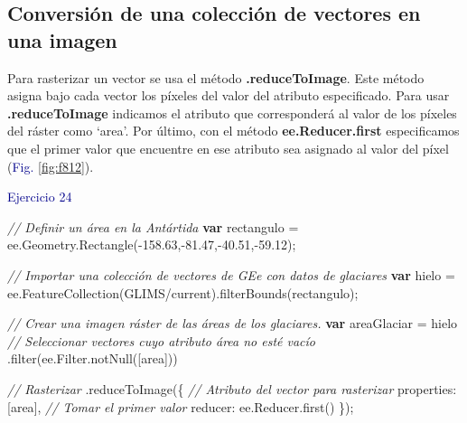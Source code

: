 \documentclass[
  12pt,
  letterpaper,
  twoside]{book}
\newenvironment{Shaded}{\begin{snugshade}}{\end{snugshade}}
\newcommand{\AttributeTok}[1]{\textcolor[rgb]{0.48,0.12,0.64}{#1}}
\newcommand{\CommentTok}[1]{\textcolor[rgb]{0.24,0.58,0.00}{\textit{#1}}}
\newcommand{\ControlFlowTok}[1]{\textcolor[rgb]{0.00,0.00,0.00}{\textbf{#1}}}
\newcommand{\DataTypeTok}[1]{\textcolor[rgb]{0.00,0.00,0.00}{#1}}
\newcommand{\FloatTok}[1]{\textcolor[rgb]{0.28,0.53,0.93}{#1}}
\newcommand{\FunctionTok}[1]{\textcolor[rgb]{0.48,0.12,0.64}{#1}}
\newcommand{\KeywordTok}[1]{\textcolor[rgb]{0.48,0.12,0.64}{#1}}
\newcommand{\NormalTok}[1]{#1}
\newcommand{\OperatorTok}[1]{\textcolor[rgb]{0.00,0.00,0.00}{#1}}
\newcommand{\StringTok}[1]{\textcolor[rgb]{0.87,0.29,0.22}{#1}}
\newcommand\boldpurple[1]{\textcolor{darkpurple}{\textbf{#1}}}
\begin{document}
\hypertarget{conversiuxf3n-de-una-colecciuxf3n-de-vectores-en-una-imagen}{%
\subsection*{Conversión de una colección de vectores en una imagen}\label{conversiuxf3n-de-una-colecciuxf3n-de-vectores-en-una-imagen}}

Para rasterizar un vector se usa el método \boldpurple{.reduceToImage}. Este método asigna bajo cada vector los píxeles del valor del atributo especificado. Para usar \boldpurple{.reduceToImage} indicamos el atributo que corresponderá al valor de los píxeles del ráster como `area'. Por último, con el método \boldpurple{ee.Reducer.first} especificamos que el primer valor que encuentre en ese atributo sea asignado al valor del píxel (\textcolor{darkblue}{Fig.} \ref{fig:f812}).

\textcolor{darkblue}{Ejercicio 24}

\begin{Shaded}
\begin{Highlighting}[]
\CommentTok{// Definir un área en la Antártida}
\ControlFlowTok{var}\NormalTok{ rectangulo }\OperatorTok{=} \KeywordTok{ee}\OperatorTok{.}\AttributeTok{Geometry}\OperatorTok{.}\FunctionTok{Rectangle}\NormalTok{(}\OperatorTok{{-}}\FloatTok{158.63}\OperatorTok{,{-}}\FloatTok{81.47}\OperatorTok{,{-}}\FloatTok{40.51}\OperatorTok{,{-}}\FloatTok{59.12}\NormalTok{)}\OperatorTok{;}

\CommentTok{// Importar una colección de vectores de GEe con datos de glaciares}
\ControlFlowTok{var}\NormalTok{ hielo }\OperatorTok{=} \KeywordTok{ee}\OperatorTok{.}\FunctionTok{FeatureCollection}\NormalTok{(}\StringTok{\textquotesingle{}GLIMS/current\textquotesingle{}}\NormalTok{)}\OperatorTok{.}\FunctionTok{filterBounds}\NormalTok{(rectangulo)}\OperatorTok{;}

\CommentTok{// Crear una imagen ráster de las áreas de los glaciares.}
\ControlFlowTok{var}\NormalTok{ areaGlaciar }\OperatorTok{=}\NormalTok{ hielo}
\CommentTok{// Seleccionar vectores cuyo atributo área no esté vacío}
    \OperatorTok{.}\FunctionTok{filter}\NormalTok{(}\KeywordTok{ee}\OperatorTok{.}\AttributeTok{Filter}\OperatorTok{.}\FunctionTok{notNull}\NormalTok{([}\StringTok{\textquotesingle{}area\textquotesingle{}}\NormalTok{])) }
    
\CommentTok{// Rasterizar  }
\OperatorTok{.}\FunctionTok{reduceToImage}\NormalTok{(\{}
    \CommentTok{// Atributo del vector para rasterizar}
    \DataTypeTok{properties}\OperatorTok{:}\NormalTok{ [}\StringTok{\textquotesingle{}area\textquotesingle{}}\NormalTok{]}\OperatorTok{,} 
    \CommentTok{// Tomar el primer valor}
    \DataTypeTok{reducer}\OperatorTok{:} \KeywordTok{ee}\OperatorTok{.}\AttributeTok{Reducer}\OperatorTok{.}\FunctionTok{first}\NormalTok{()  }
\NormalTok{    \})}\OperatorTok{;}
\end{Highlighting}
\end{Shaded}
\end{document}
